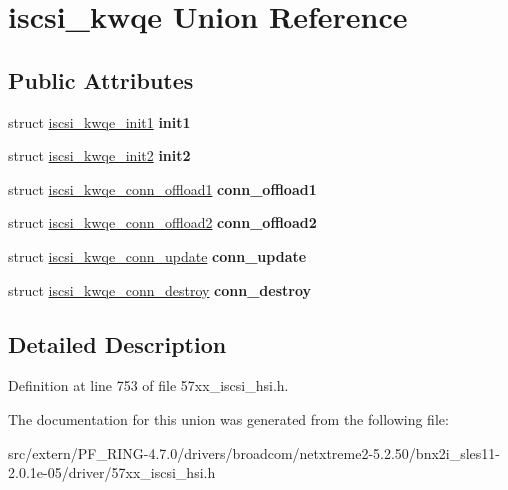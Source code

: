\hypertarget{unioniscsi__kwqe}{
\section{iscsi\_\-kwqe Union Reference}
\label{unioniscsi__kwqe}
}
\subsection*{Public Attributes}
\begin{DoxyCompactItemize}
\item 
\hypertarget{unioniscsi__kwqe_a99a66c476eeab765e48691b9f4a5133f}{
struct \hyperlink{structiscsi__kwqe__init1}{iscsi\_\-kwqe\_\-init1} {\bfseries init1}}
\label{unioniscsi__kwqe_a99a66c476eeab765e48691b9f4a5133f}

\item 
\hypertarget{unioniscsi__kwqe_ab07fc8ccb281371e194bfb1dd784fec1}{
struct \hyperlink{structiscsi__kwqe__init2}{iscsi\_\-kwqe\_\-init2} {\bfseries init2}}
\label{unioniscsi__kwqe_ab07fc8ccb281371e194bfb1dd784fec1}

\item 
\hypertarget{unioniscsi__kwqe_a0b938dd37023f26d231d09f2d68ce7d3}{
struct \hyperlink{structiscsi__kwqe__conn__offload1}{iscsi\_\-kwqe\_\-conn\_\-offload1} {\bfseries conn\_\-offload1}}
\label{unioniscsi__kwqe_a0b938dd37023f26d231d09f2d68ce7d3}

\item 
\hypertarget{unioniscsi__kwqe_a075048cbabb021a696e62cd21030ce8b}{
struct \hyperlink{structiscsi__kwqe__conn__offload2}{iscsi\_\-kwqe\_\-conn\_\-offload2} {\bfseries conn\_\-offload2}}
\label{unioniscsi__kwqe_a075048cbabb021a696e62cd21030ce8b}

\item 
\hypertarget{unioniscsi__kwqe_ad04c0a3d554623197d412c34d689f19d}{
struct \hyperlink{structiscsi__kwqe__conn__update}{iscsi\_\-kwqe\_\-conn\_\-update} {\bfseries conn\_\-update}}
\label{unioniscsi__kwqe_ad04c0a3d554623197d412c34d689f19d}

\item 
\hypertarget{unioniscsi__kwqe_a9b06cab351a2fd0e679129f8fc5a22a7}{
struct \hyperlink{structiscsi__kwqe__conn__destroy}{iscsi\_\-kwqe\_\-conn\_\-destroy} {\bfseries conn\_\-destroy}}
\label{unioniscsi__kwqe_a9b06cab351a2fd0e679129f8fc5a22a7}

\end{DoxyCompactItemize}


\subsection{Detailed Description}


Definition at line 753 of file 57xx\_\-iscsi\_\-hsi.h.



The documentation for this union was generated from the following file:\begin{DoxyCompactItemize}
\item 
src/extern/PF\_\-RING-\/4.7.0/drivers/broadcom/netxtreme2-\/5.2.50/bnx2i\_\-sles11-\/2.0.1e-\/05/driver/57xx\_\-iscsi\_\-hsi.h\end{DoxyCompactItemize}
